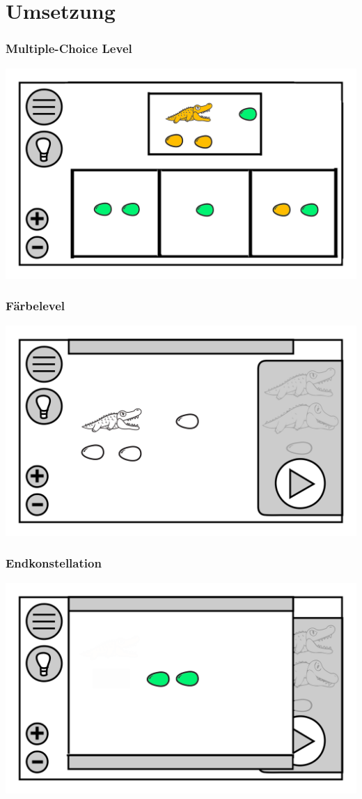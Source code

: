 \documentclass[t]{beamer}
\begin{document}
\section{Umsetzung}
\begin{frame}
	\frametitle{Multiple-Choice Level}
	\includegraphics[height=\textheight]{level_choice.png}
\end{frame}
\begin{frame}
	\frametitle{Färbelevel}
	\includegraphics[height=\textheight]{level_white.png}
\end{frame}
\begin{frame}
	\frametitle{Endkonstellation}
	\includegraphics[height=\textheight]{level_end_color.png}
\end{frame}
\end{document}
